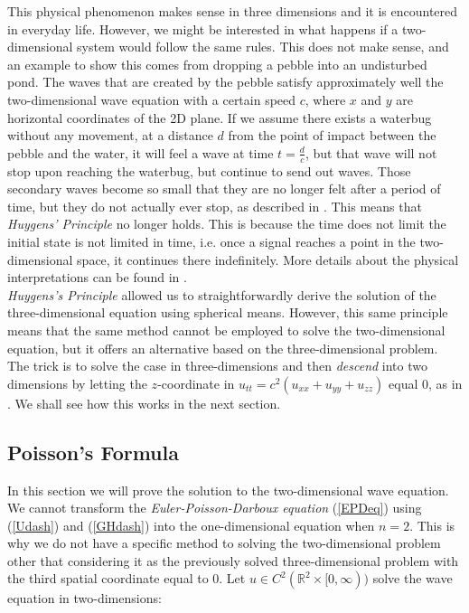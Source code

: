 \documentclass[a4paper, 12pt]{article}
\numberwithin{equation}{section}
\begin{document}
This physical phenomenon makes sense in three dimensions and it is encountered in everyday life. However, we might be interested in what happens if a two-dimensional system would follow
the same rules. This does not make sense, and an example to show this comes from dropping a pebble into an undisturbed pond. The waves that are created by the pebble satisfy 
approximately well the two-dimensional wave equation with a certain speed $c$, where $x$ and $y$ are horizontal coordinates of the 2D plane. If we assume there exists
a waterbug without any movement, at a distance $d$ from the point of impact between the pebble and the water, it will feel a wave at time $t=\frac{d}{c}$, but that wave will
not stop upon reaching the waterbug, but continue to send out waves. Those secondary waves become so small that they are no longer felt after a period of time, but they 
do not actually ever stop, as described in \cite{Str}. This means that \emph{Huygens' Principle} no longer holds. This is because the time does not limit the initial state is not limited 
in time, i.e. once a signal reaches a point in the two-dimensional space, it continues there indefinitely. More details about the physical interpretations can be found in \cite{Hil}.
\\

\emph{Huygens's Principle} allowed us to straightforwardly derive the solution of the three-dimensional equation using spherical means. However, this same principle
means that the same method cannot be employed to solve the two-dimensional equation, but it offers an alternative based on the three-dimensional problem. The trick is
to solve the case in three-dimensions and then \emph{descend} into two dimensions by letting the $z$-coordinate in $u_{tt}=c^2(u_{xx}+u_{yy}+u_{zz})$ equal $0$, as in \cite{Ev}. We shall see how this works in the 
next section. 

\subsection{Poisson's Formula}

In this section we will prove the solution to the two-dimensional wave equation. We cannot transform the \emph{Euler-Poisson-Darboux equation} (\ref{EPDeq}) using (\ref{Udash}) and (\ref{GHdash}) 
into the one-dimensional equation when $n=2$. This is why we do not have a specific method to solving the two-dimensional problem other that considering it as the previously solved three-dimensional problem
with the third spatial coordinate equal to $0$. Let $u \in C^2(\mathbb{R}^2 \times [0, \infty))$ solve the wave equation in two-dimensions:
\end{document}

